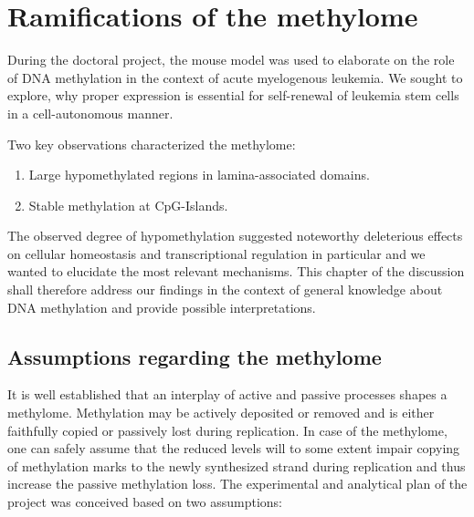 \chapter{Ramifications of  the \dnmtchipheadline methylome}
\label{chap:d:methylation}
\minitoc

During the doctoral project, the \dnmtchip mouse model\cite{Gaudet2003} was used to elaborate on the role of DNA methylation in the context of \mllafnine acute myelogenous leukemia. We sought to explore, why proper  expression is essential for self-renewal of \mllafnine leukemia stem cells in a cell-autonomous manner\cite{Vockentanz2011}. 

Two key observations characterized the \dnmtchip methylome:

\begin{enumerate}
	\item Large hypomethylated regions in lamina-associated domains.
	\item Stable methylation at CpG-Islands.
\end{enumerate}

The observed degree of hypomethylation suggested noteworthy deleterious effects on cellular homeostasis and transcriptional regulation in particular and we wanted to elucidate the most relevant mechanisms. This chapter of the discussion shall therefore address our findings in the context of general knowledge about DNA methylation and provide possible interpretations. 

\section{Assumptions regarding the \dnmtchipheadline methylome}
\label{chap:d:methylation:shaping}

It is well established that an interplay of active and passive processes shapes a methylome. Methylation may be actively deposited or removed and is either faithfully copied or passively lost during replication. In case of the \dnmtchip methylome, one can safely assume that the reduced  levels will to some extent impair copying of methylation marks to the newly synthesized strand during replication and thus increase the passive methylation loss. The experimental and analytical plan of the project was conceived  based on two assumptions: 

